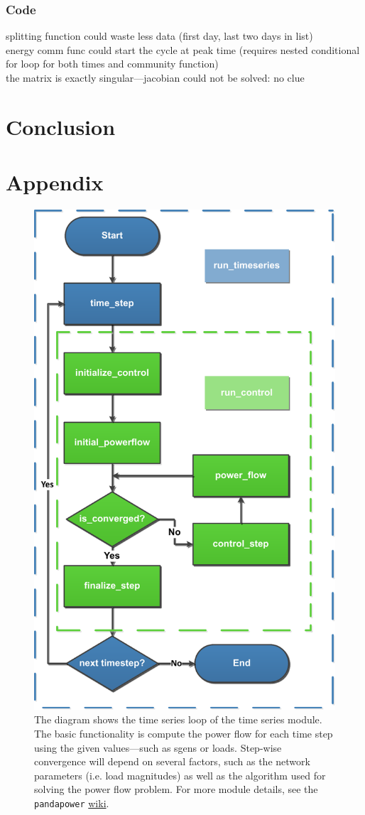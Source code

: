\documentclass[a4paper,10pt]{report}
\begin{document}
\subsection{Code}
splitting function could waste less data (first day, last two days in list)\\
energy comm func could start the cycle at peak time (requires nested conditional for loop for both times and community function)\\
the matrix is exactly singular---jacobian could not be solved: no clue\\



\chapter{Conclusion}


\chapter*{Appendix}\label{chapter_appendix}

\begin{figure}[htpb]
	\centering
	\includegraphics[width=0.45\linewidth]{timeseries_module_diag.pdf}
	\caption[\texttt{pandapower} times series module overview]{The diagram shows the time series loop of the time series module. The basic functionality is compute the power flow for each time step using the given values---such as sgens or loads. Step-wise convergence will depend on several factors, such as the network parameters (i.e. load magnitudes) as well as the algorithm used for solving the power flow problem. For more module details, see the \texttt{pandapower}  \href{https://pandapower.readthedocs.io/en/v2.10.1/timeseries/timeseries_loop.html}{wiki}.}
	\label{timeseries_module_diag}
\end{figure}
\end{document}
